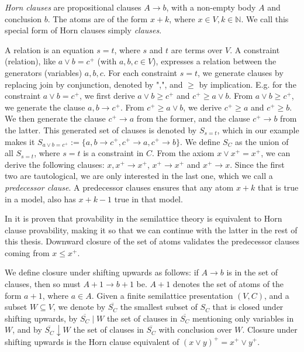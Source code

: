 \emph{Horn clauses} are propositional clauses $A \rightarrow b$, with a non-empty body $A$ and conclusion $b$.
The atoms are of the form $x + k$, where $x \in V, k \in \mathbb{N}$.
We call this special form of Horn clauses simply \emph{clauses}.

A relation is an equation $s = t$, where $s$ and $t$ are terms over $V$.
A constraint (relation), like $a \lor b = c^+$ (with $a, b, c \in V$), expresses a relation between the generators (variables) $a, b, c$.
For each constraint $s = t$, we generate clauses by replacing join by conjunction, denoted by ",", and $\geq$ by implication.
E.g. for the constraint $a \lor b = c^+$, we first derive $a \lor b \geq c^+$ and $c^+ \geq a \lor b$.
From $a \lor b \geq c^+$, we generate the clause $a, b \rightarrow c^+$.
From $c^+ \geq a \lor b$, we derive $c^+ \geq a$ and $c^+ \geq b$.
We then generate the clause $c^+ \rightarrow a$ from the former, and the clause $c^+ \rightarrow b$ from the latter.
This generated set of clauses is denoted by $S_{s=t}$, which in our example makes it
$S_{a \lor b = c^+} := \{a, b \rightarrow c^+, c^+ \rightarrow a, c^+ \rightarrow b\}$.
We define $S_C$ as the union of all $S_{s=t}$, where $s = t$ is a constraint in $C$.
From the axiom $x \lor x^+ = x^+$, we can derive the following clauses:
$x, x^+ \rightarrow x^+$,
$x^+ \rightarrow x^+$ and $x^+ \rightarrow x$.
Since the first two are tautological,
we are only interested in the last one, which we call a \emph{predecessor clause}.
A predecessor clauses ensures that any atom $x + k$ that is true in a model,
also has $x + k - 1$ true in that model.

In \cite[Theorem 2.2,~p.~3]{mbezem} it is proven that provability in the semilattice theory
is equivalent to Horn clause provability, making it so that we can continue with the latter in the rest of this thesis.
Downward closure of the set of atoms validates the predecessor clauses
coming from $x \leq x^+$.

We define closure under shifting upwards as follows:
if $A \rightarrow b$ is in the set of clauses, then so must $A + 1 \rightarrow b + 1$ be.
$A + 1$ denotes the set of atoms of the form $a + 1$, where $a \in A$.
Given a finite semilattice presentation $(V, C)$,
and a subset $W \subseteq V$, we denote by
$\overline{S_C}$ the smallest subset of $S_C$ that is closed under shifting upwards,
by $\overline{S_C} \mid W$ the set of clauses in $\overline{S_C}$
mentioning only variables in $W$, and by $\overline{S_C} \downarrow W$
the set of clauses in $\overline{S_C}$ with conclusion over $W$.
Closure under shifting upwards is the Horn clause equivalent of
$(x \lor y)^+ = x^+ \lor y^+$.

